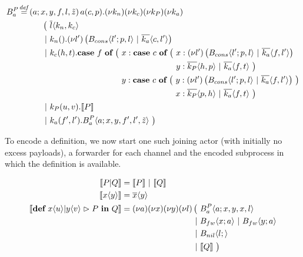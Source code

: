 \begin{align*}
  \adef*{B_a^P}{a}{x,y,f,l,\tilde{z}}{\arcv{a}{c,p} . \anew{k_n}{\anew{k_c}{\anew{k_P}{\anew{k_a}{
    \\
    &\hspace{1cm}
    \begin{aligned}[t]
      \big(\ &\asnd{l}{k_n,k_c}
      \\
      \apar  &\arcv{k_n}{} . \anew{l'}{\parens{\ains{B_{cons}}{l'}{p, l} \apar \asnd{k_a}{c, l'}}}
      \\
      \apar  &\arcv{k_c}{h,t} .
        \begin{aligned}[t]
          \acse*{f}{\ 
            &\aalt{x}{
              \begin{aligned}[t]
                \acse*{c}{\ 
                  &\aalt{x}{\anew*{l'}{
                    \ains{B_{cons}}{l'}{p,l} \apar \asnd{k_a}{f,l'}
                  }}\\
                  &\aalt{y}{
                    \asnd{k_P}{h,p} \apar \asnd{k_a}{f,t}
                  }\ 
                }
              \end{aligned}
            }\\
            &\aalt{y}{
              \begin{aligned}[t]
                \acse*{c}{\ 
                  &\aalt{y}{\anew*{l'}{
                    \ains{B_{cons}}{l'}{p,l} \apar \asnd{k_a}{f,l'}
                  }}\\
                  &\aalt{x}{
                    \asnd{k_P}{p,h} \apar \asnd{k_a}{f,t}
                  }\ 
                }
              \end{aligned}
            }\ 
          }
        \end{aligned}
      \\
      \apar  &\arcv{k_P}{u,v} . \encMJtoAP{P}
      \\
      \apar  &\arcv{k_a}{f',l'} . \ains{B_a^P}{a}{x, y, f', l',\tilde{z}}
      \ \big)
    \end{aligned}
  }}}}} \\
\end{align*}

To encode a \joincalc definition,
we now start one such joining actor (with initially no excess payloads),
a forwarder for each channel
and the encoded subprocess in which the definition is available.

\begin{align*}
  \encMJtoAP{P \jpar Q}
  &= \encMJtoAP{P} \apar \encMJtoAP{Q}
  \\
  \encMJtoAP{\jsnd{x}{y}}
  &= \asnd{x}{y}
  \\
  \encMJtoAP{\jdef{\jrct{\jrcv{x}{u} \jpat \jrcv{y}{v}}{P}}{Q}}
  &= \anew{a}{\anew{x}{\anew{y}{\anew{l}{
    \begin{aligned}[t]
      \big(\ &\ains{B_a^P}{a}{x, y, x, l} \\
      \apar  &\ains{B_{fw}}{x}{a} \apar \ains{B_{fw}}{y}{a} \\
      \apar  &\ains{B_{nil}}{l}{} \\
      \apar  &\encMJtoAP{Q}
      \ \big)
    \end{aligned}
  }}}}
\end{align*}

